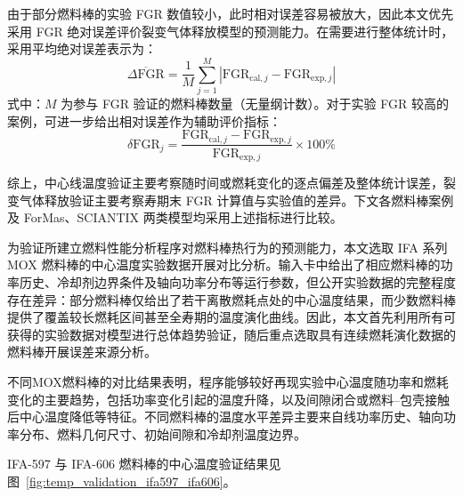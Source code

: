 由于部分燃料棒的实验 FGR 数值较小，此时相对误差容易被放大，因此本文优先采用 FGR 绝对误差评价裂变气体释放模型的预测能力。在需要进行整体统计时，采用平均绝对误差表示为：
\begin{equation}
	\overline{\Delta \mathrm{FGR}} =
	\frac{1}{M}\sum_{j=1}^{M}
	\left|\mathrm{FGR}_{\mathrm{cal},j}-\mathrm{FGR}_{\mathrm{exp},j}\right|
\end{equation}
\noindent 式中：$M$ 为参与 FGR 验证的燃料棒数量（无量纲计数）。对于实验 FGR 较高的案例，可进一步给出相对误差作为辅助评价指标：
\begin{equation}
	\delta \mathrm{FGR}_j =
	\frac{\mathrm{FGR}_{\mathrm{cal},j}-\mathrm{FGR}_{\mathrm{exp},j}}
	{\mathrm{FGR}_{\mathrm{exp},j}}\times 100\%
\end{equation}

综上，中心线温度验证主要考察随时间或燃耗变化的逐点偏差及整体统计误差，裂变气体释放验证主要考察寿期末 FGR 计算值与实验值的差异。下文各燃料棒案例及 ForMas、SCIANTIX 两类模型均采用上述指标进行比较。



为验证所建立燃料性能分析程序对燃料棒热行为的预测能力，本文选取 IFA 系列 MOX 燃料棒的中心温度实验数据开展对比分析。输入卡中给出了相应燃料棒的功率历史、冷却剂边界条件及轴向功率分布等运行参数，但公开实验数据的完整程度存在差异：部分燃料棒仅给出了若干离散燃耗点处的中心温度结果，而少数燃料棒提供了覆盖较长燃耗区间甚至全寿期的温度演化曲线。因此，本文首先利用所有可获得的实验数据对模型进行总体趋势验证，随后重点选取具有连续燃耗演化数据的燃料棒开展误差来源分析。

不同MOX燃料棒的对比结果表明，程序能够较好再现实验中心温度随功率和燃耗变化的主要趋势，包括功率变化引起的温度升降，以及间隙闭合或燃料--包壳接触后中心温度降低等特征。不同燃料棒的温度水平差异主要来自线功率历史、轴向功率分布、燃料几何尺寸、初始间隙和冷却剂温度边界。

IFA-597 与 IFA-606 燃料棒的中心温度验证结果见图~\ref{fig:temp_validation_ifa597_ifa606}。

